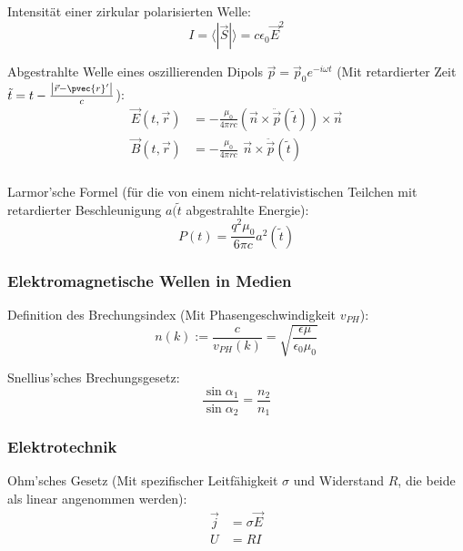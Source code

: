 \documentclass[11pt]{article}
\numberwithin{equation}{section}
\begin{document}
        Intensität einer zirkular polarisierten Welle:
        \begin{equation}
          I = \langle|\vec{S}|\rangle = c\epsilon_0\vec{E}^2
        \end{equation}

        Abgestrahlte Welle eines oszillierenden Dipols $\vec{p} = \vec{p}_0 e^{-i\omega t}$ (Mit retardierter Zeit $\tilde{t} = t-\frac{\left|\vec{r}-\pvec{r}'\right|}{c}$):
        \begin{equation}
          \begin{aligned}
            \vec{E}(t,\vec{r}) &= -\frac{\mu_0}{4\pi r c}  \left(\vec{n}\times\ddot{\vec{p}}(\tilde{t})\right) \times \vec{n} \\
            \vec{B}(t,\vec{r}) &= -\frac{\mu_0}{4\pi r c} \phantom{\Big(}\vec{n}\times\ddot{\vec{p}}(\tilde{t}) \\
          \end{aligned}
        \end{equation}

        Larmor'sche Formel (für die von einem nicht-relativistischen Teilchen mit retardierter Beschleunigung $a(\tilde{t}$ abgestrahlte Energie):
        \begin{equation}
          P(t) = \frac{q^2 \mu_0}{6\pi c}a^2(\tilde{t})
        \end{equation}

      \subsubsection{Elektromagnetische Wellen in Medien}
        Definition des Brechungsindex (Mit Phasengeschwindigkeit $v_{PH}$):
        \begin{equation}
          n(k) := \frac{c}{v_{PH}(k)} = \sqrt{\frac{\epsilon\mu}{\epsilon_0\mu_0}}
        \end{equation}

        Snellius'sches Brechungsgesetz:
        \begin{equation}
          \frac{\sin\alpha_1}{\sin\alpha_2} = \frac{n_2}{n_1}
        \end{equation}



      \subsubsection{Elektrotechnik}
        Ohm'sches Gesetz (Mit spezifischer Leitfähigkeit $\sigma$ und Widerstand $R$, die beide als linear angenommen werden):
        \begin{equation}
          \begin{aligned}
            \vec{j} &= \sigma\vec{E} \\
            U &= R I
          \end{aligned}
        \end{equation}
\end{document}
